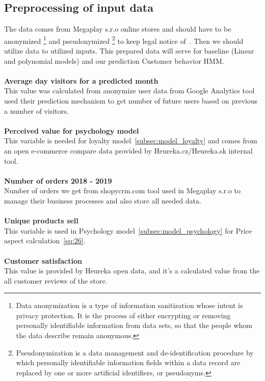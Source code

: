 \subsection{Preprocessing of input data} \label{sec:preprocessing}
The data comes from Megaplay s.r.o online stores and should have to be anonymized \footnote{Data anonymization is a type of information sanitization whose intent is privacy protection.
It is the process of either encrypting or removing personally identifiable information from data sets, so that
the people whom the data describe remain anonymous.} and pseudonymized \footnote{Pseudonymization is a data management
and de-identification procedure by which personally identifiable information fields within a data record are replaced
by one or more artificial identifiers, or pseudonyms.} to keep legal notice of~\cite{gdpr}.
Then we should utilize data to utilized inputs.
This prepared data will serve for baseline (Linear and polynomial models) and our prediction Customer behavior HMM.\\
\\
\textbf{Average day visitors for a predicted month}\\
This value was calculated from anonymize user data from Google Analytics tool used their prediction mechanism to get number of future users based on previous a number of visitors.\\
\\
\textbf{Perceived value for psychology model} \label{perceived}\\
This variable is needed for loyalty model~\ref{subsec:model_loyalty} and comes from an open e-commerce compare data provided by Heureka.cz/Heureka.sk internal tool.\\
\\
\textbf{Number of orders 2018 - 2019}\\
Number of orders we get from shopycrm.com tool used in Megaplay s.r.o to manage their business processes and also store all needed data.\\
\\
\textbf{Unique products sell}\\
This variable is used in Psychology model~\ref{subsec:model_psychology} for Price aspect calculation~\ref{eq:26}.\\
\\
\textbf{Customer satisfaction} \label{customerSat}\\
This value is provided by Heureka open data, and it's a calculated value from the all customer reviews of the store.\\
